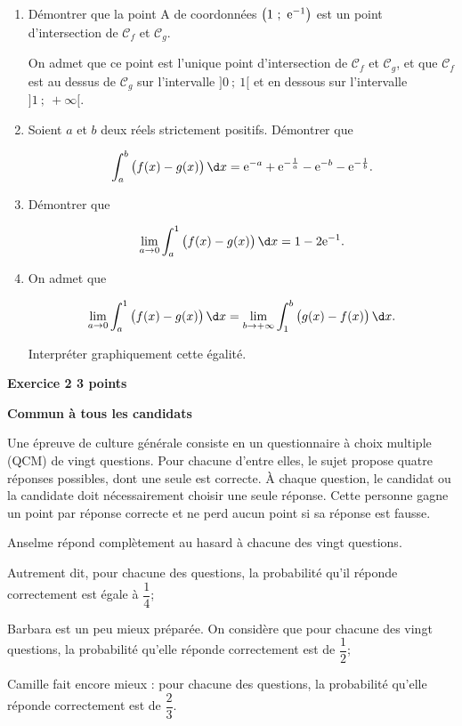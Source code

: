 \documentclass[10pt,a4paper]{article}
\def\e{\text{e}}
\newcommand{\ds}{\displaystyle}%
\begin{document}
\begin{enumerate}
\item Démontrer que la point A de coordonnées $\left (1~;~\e^{-1}\strut\right )$ est un point d'intersection de $\mathcal{C}_f$ et $\mathcal{C}_g$.

\smallskip

On admet que ce point est l'unique point d'intersection de $\mathcal{C}_f$ et $\mathcal{C}_g$, et que $\mathcal{C}_f$ est au dessus de $\mathcal{C}_g$ sur l'intervalle $]0~;~1[$ et en dessous sur l'intervalle $]1~;~+\infty[$.

\item Soient $a$ et $b$ deux réels strictement positifs. Démontrer que

\[\ds\int_{a}^{b} \left ( f(x)-g(x)\strut\right ) \d x = \e^{-a} + \e^{-\frac{1}{a}} - \e^{-b} - \e^{-\frac{1}{b}}.\]

\item Démontrer que

\[\ds\lim_{a\to 0} \ds\int_{a}^{1} \left ( f(x)-g(x)\strut\right ) \d x =1-2\e^{-1}.\]

\item On admet que

\[\ds\lim_{a\to 0} \ds\int_{a}^{1} \left ( f(x)-g(x)\strut\right ) \d x =\ds\lim_{b\to +\infty} \ds\int_{1}^{b} \left ( g(x)-f(x)\strut\right ) \d x .\]

Interpréter graphiquement cette égalité.

\end{enumerate}

\vspace{0,25cm}

\textbf{Exercice 2 \hfill 3 points}

\medskip

\textbf{Commun à tous les candidats}

\bigskip

Une épreuve de culture générale consiste en un questionnaire à choix multiple (QCM) de vingt questions. Pour chacune d'entre elles, le sujet propose quatre réponses possibles, dont une seule est correcte. À chaque question, le candidat ou la candidate doit nécessairement choisir une seule réponse. Cette personne gagne un point par réponse correcte et ne perd aucun point si sa réponse est fausse.

\medskip

\begin{list}{\textbullet}{On considère trois candidats:}
\item Anselme répond complètement au hasard à chacune des vingt questions.

Autrement dit, pour chacune des questions, la probabilité qu'il réponde correctement est égale à $\dfrac{1}{4}$;
\item Barbara est un peu mieux préparée. On considère que pour chacune des vingt questions, la probabilité qu'elle réponde correctement est de $\dfrac{1}{2}$;
\item Camille fait encore mieux : pour chacune des questions, la probabilité qu'elle réponde correctement est de $\dfrac{2}{3}$.
\end{list}
\end{document}

